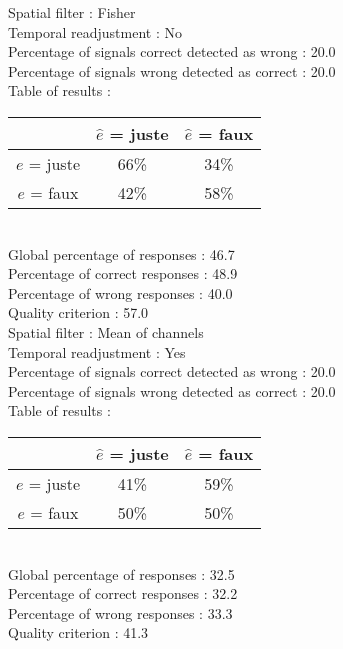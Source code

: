 Spatial filter : Fisher \\
Temporal readjustment : No \\
Percentage of signals correct detected as wrong :   20.0 \\
Percentage of signals wrong detected as correct :   20.0 \\
Table of results : \\
\begin{tabular}{|c|c|c|}
\hline				& $\hat{e}$ = juste & $\hat{e}$ = faux \\
\hline  $e$ = juste	&     66\%			&     34\%		\\
\hline  $e$ = faux	&     42\%			&     58\%		\\
\hline
\end{tabular}\\
Global percentage of responses :   46.7 \\
Percentage of correct responses :   48.9 \\
Percentage of wrong responses :   40.0 \\
Quality criterion :   57.0 \\

Spatial filter : Mean of channels \\
Temporal readjustment : Yes \\
Percentage of signals correct detected as wrong :   20.0 \\
Percentage of signals wrong detected as correct :   20.0 \\
Table of results : \\
\begin{tabular}{|c|c|c|}
\hline				& $\hat{e}$ = juste & $\hat{e}$ = faux \\
\hline  $e$ = juste	&     41\%			&     59\%		\\
\hline  $e$ = faux	&     50\%			&     50\%		\\
\hline
\end{tabular}\\
Global percentage of responses :   32.5 \\
Percentage of correct responses :   32.2 \\
Percentage of wrong responses :   33.3 \\
Quality criterion :   41.3 \\

